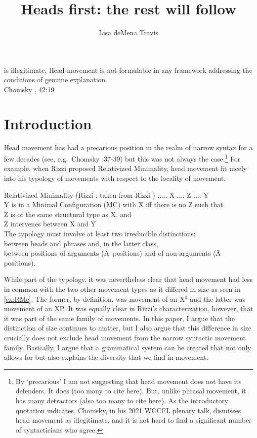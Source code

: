 \documentclass[output=paper,colorlinks,citecolor=brown,
]{langscibook}
\author{Lisa deMena Travis\affiliation{McGill University}\orcid{}}
\title{Heads first: the rest will follow}
\begin{document}
\maketitle


\vspace{1cm}
 is illegitimate.  Head-movement is not formulable in any framework addressing the conditions of genuine explanation.\\
 \hspace*{\fill} Chomsky \citeyear{Chomsky:2021}, 42:19

\section{Introduction}

Head movement has had a precarious position in the realm of narrow syntax for a few decades (see, e.g.\ Chomsky \citeyear{Chomsky:2001a}:37-39) but this was not always the case.\footnote{By `precarious'  I am not suggesting that  head movement does not have its defenders.  It does (too many to cite here).  But, unlike phrasal movement, it has many detractors (also too many to cite here).  As the introductory quotation indicates, Chomsky, in his 2021 WCCFL plenary talk, dismisses head movement as illegitimate, and it is not hard to find a significant number of syntacticians who agree.} For example, when Rizzi proposed Relativized Minimality, head movement fit nicely into his typology of movements with respect to the locality of movement.  

\ea Relativized Minimality (Rizzi \citeyear{Rizzi:1990}: taken from Rizzi \citeyear{Rizzi:2001a})
    \ea ..... X .... Z .... Y\\
    \ex Y is in a Minimal Configuration (MC) with X iff there is no Z such that\\
        \ea Z is of the same structural type as X, and\\
        \ex Z intervenes between X and Y\\
        \z
    \ex The typology must involve at least two irreducible\label{ex:RMc}
    distinctions:\\
        \ea between heads and phrases and, in the latter class,\\
        \ex between positions of arguments (A--positions) and of non-arguments
    (\=A--positions).
        \z
    \z
\z


While part of the typology, it was nevertheless clear that head movement had less in common with the two other movement types as it differed in size as seen in \ref{ex:RMc}. The former, by definition, was movement of an X$^0$ and the latter was movement of an XP.  It was equally clear in Rizzi's characterization, however, that it was part of the same family of movements.  In this paper, I argue that the distinction of size continues to matter, but I also argue that this difference in size crucially does  not exclude head movement from the narrow syntactic movement family.  Basically, I argue that a grammatical system can be created that not only allows for but also explains the diversity that we find in movement.
\end{document}
